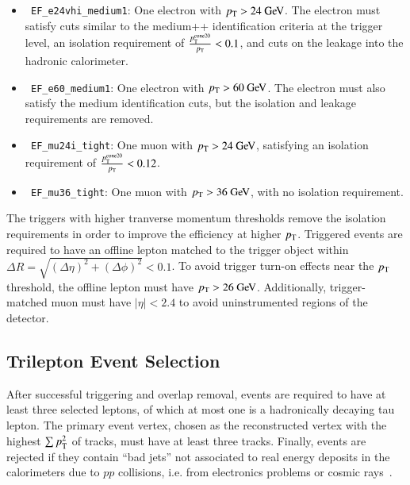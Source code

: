 \begin{itemize}
	\item \texttt{ EF\_e24vhi\_medium1}: One electron with $\pt>24 \GeV$. The electron must satisfy cuts similar to the medium++ identification criteria at the trigger level, an isolation requirement of $\frac{p_{\text{T}}^{\mathrm{cone}20}}{p_{\text{T}}}<0.1$, and cuts on the leakage into the hadronic calorimeter.
	\item \texttt{ EF\_e60\_medium1}: One electron with $\pt>60 \GeV$. The electron must also satisfy the medium identification cuts, but the isolation and leakage requirements are removed.
	\item \texttt{ EF\_mu24i\_tight}: One muon with $\pt>24 \GeV$, satisfying an isolation requirement of $\frac{p_{\text{T}}^{\mathrm{cone}20}}{p_{\text{T}}}<0.12$.
	\item \texttt{ EF\_mu36\_tight}: One muon with $\pt>36 \GeV$, with no isolation requirement.
\end{itemize}

The triggers with higher tranverse momentum thresholds remove the isolation requirements in order to improve the efficiency at higher $p_{\text{T}}$. Triggered events are required to have an offline lepton matched to the trigger object within $\Delta R=\sqrt{(\Delta\eta)^2+(\Delta\phi)^2} < 0.1$. To avoid trigger turn-on effects near the $p_{\text{T}}$ threshold, the offline lepton must have $\pt>26 \GeV$. Additionally, trigger-matched muon must have $|\eta|<2.4$ to avoid uninstrumented regions of the detector.


\subsection{Trilepton Event Selection}\label{sec:model-independent-trilepton-event-selection}
After successful triggering and overlap removal, events are required to have at least three selected leptons, of which at most one is a hadronically decaying tau lepton. The primary event vertex, chosen as the reconstructed vertex with the highest $\sum p_{\text{T}}^2$ of tracks, must have at least three tracks. Finally, events are rejected if they contain ``bad jets'' not associated to real energy deposits in the calorimeters due to $pp$ collisions, i.e. from electronics problems or cosmic rays~\cite{TheATLASCollaboration:2015ds}.


